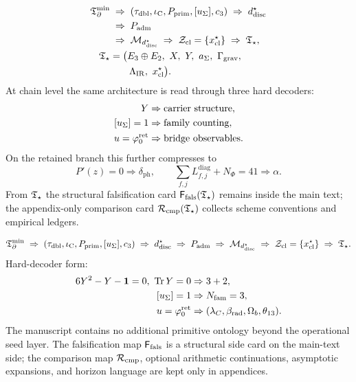 \begin{tcolorbox}[colback=tfptblue!3, colframe=tfptblue, breakable,
    title={Closed TFPT Chain}, colbacktitle=tfptblue]
\begin{equation}
\label{eq:compiler-chain}
\begin{aligned}
\mathfrak T_{\partial}^{\min}
&\;\Rightarrow\;
(\tau_{\mathrm{dbl}},\iota_{\mathrm C},P_{\mathrm{prim}},[u_\Sigma],c_3)
\;\Rightarrow\;
d^\star_{\mathrm{disc}}\\
&\;\Rightarrow\;
P_{\mathrm{adm}}
\\
&\;\Rightarrow\;
\mathcal M_{d^\star_{\mathrm{disc}}}
\;\Rightarrow\;
\mathcal Z_{\mathrm{cl}}=\{x^\star_{\mathrm{cl}}\}
\;\Rightarrow\;
\mathfrak T_{\star},\\
\mathfrak T_{\star}
&=
\bigl(
E_3\oplus E_2,\ X,\ Y,\ a_\Sigma,\ \Gamma_{\mathrm{grav}},\\
&\qquad
\Lambda_{\mathrm{IR}},\ x_{\mathrm{cl}}^\star
\bigr).
\end{aligned}
\end{equation}
At chain level the same architecture is read through three hard decoders:
\[
\begin{aligned}
Y&\Rightarrow \text{carrier structure},\\
[u_\Sigma]=1&\Rightarrow \text{family counting},\\
u=\varphi_0^{\mathrm{ret}}&\Rightarrow \text{bridge observables}.
\end{aligned}
\]
On the retained branch this further compresses to
\[
P'(z)=0\Rightarrow \delta_{\mathrm{ph}},
\qquad
\sum_{f,j}L_{f,j}^{\mathrm{diag}}+N_\Phi=41\Rightarrow \alpha.
\]
From $\mathfrak T_{\star}$ the structural falsification card $\mathsf F_{\mathrm{fals}}(\mathfrak T_{\star})$ remains inside the main text;
the appendix-only comparison card $\mathcal R_{\mathrm{cmp}}(\mathfrak T_{\star})$ collects scheme conventions and empirical
ledgers.
\end{tcolorbox}

\begin{tcolorbox}[colback=tfptorange!4, colframe=tfptorange!80!black, breakable,
    title={Closed Theorem Stack in the Present Version}, colbacktitle=tfptorange!85!black]
\[
\mathfrak T_{\partial}^{\min}
\;\Rightarrow\;
(\tau_{\mathrm{dbl}},\iota_{\mathrm C},P_{\mathrm{prim}},[u_\Sigma],c_3)
\;\Rightarrow\;
d^\star_{\mathrm{disc}}
\;\Rightarrow\;
P_{\mathrm{adm}}
\;\Rightarrow\;
\mathcal M_{d^\star_{\mathrm{disc}}}
\;\Rightarrow\;
\mathcal Z_{\mathrm{cl}}=\{x^\star_{\mathrm{cl}}\}
\;\Rightarrow\;
\mathfrak T_{\star}.
\]
Hard-decoder form:
\[
\begin{aligned}
6Y^2-Y-\mathbf 1=0,\ \operatorname{Tr} Y=0
&\Rightarrow
3+2,\\
[u_\Sigma]=1
&\Rightarrow
N_{\mathrm{fam}}=3,\\
u=\varphi_0^{\mathrm{ret}}
&\Rightarrow
(\lambda_C,\beta_{\mathrm{rad}},\Omega_b,\theta_{13}).
\end{aligned}
\]
The manuscript contains no additional primitive ontology beyond the operational seed layer. The
falsification map $\mathsf F_{\mathrm{fals}}$ is a structural side card on the main-text side; the comparison map
$\mathcal R_{\mathrm{cmp}}$, optional arithmetic continuations, asymptotic expansions, and horizon language are
kept only in appendices.
\end{tcolorbox}

